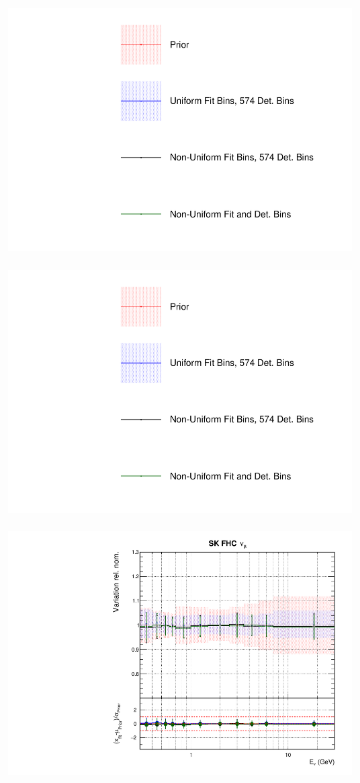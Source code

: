 \begin{figure}
\centering
\begin{subfigure}{0.3\textwidth}
  \centering
  \includegraphics[width=1.0\linewidth,  trim={5mm  80mm 0mm 0mm}, clip]{figs/polyasmvs_leg}
\end{subfigure}
\begin{subfigure}{0.3\textwidth}
  \centering
  \includegraphics[width=1.0\linewidth,  trim={5mm  0mm 0mm 95mm}, clip]{figs/polyasmvs_leg}
\end{subfigure}
\begin{subfigure}{0.45\textwidth}
  \centering
  \includegraphics[width=0.75\linewidth]{figs/polyasmvsflux_8}

\end{subfigure}
\end{figure}
